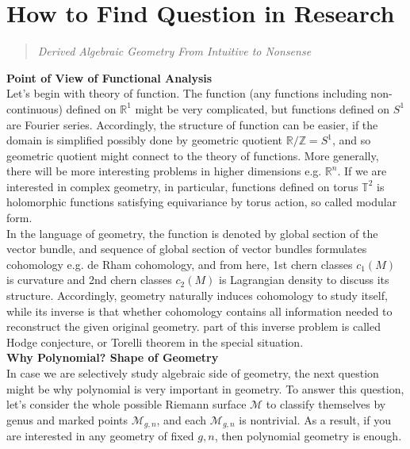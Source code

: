 \documentclass{article}
\begin{document}
\section{How to Find Question in Research}
\begin{quote}
\textit{Derived Algebraic Geometry From Intuitive to Nonsense}
\end{quote}

\noindent
\textbf{Point of View of Functional Analysis} \\

Let's begin with theory of function. The function (any functions including non-continuous) defined on $\mathbb{R}^1$ might be very complicated,
but functions defined on $S^1$ are Fourier series. Accordingly, the structure of function can be easier,
if the domain is simplified possibly done by geometric quotient $\mathbb{R}/\mathbb{Z} = S^1$,
and so geometric quotient might connect to the theory of functions.
More generally, there will be more interesting problems in higher dimensions e.g. $\mathbb{R}^n$.
If we are interested in complex geometry, in particular, functions defined on torus $\mathbb{T}^2$ is 
holomorphic functions satisfying equivariance by torus action, so called modular form. \\

In the language of geometry, the function is denoted by global section of the vector bundle,
and sequence of global section of vector bundles formulates cohomology e.g. de Rham cohomology, and from here, 
1st chern classes $c_1(M)$ is curvature and 2nd chern classes $c_2(M)$ is Lagrangian density to discuss its structure.
Accordingly, geometry naturally induces cohomology to study itself,
while its inverse is that whether cohomology contains all information needed to reconstruct the given original geometry. 
part of this inverse problem is called Hodge conjecture, or Torelli theorem in the special situation. \\


\noindent
\textbf{Why Polynomial? Shape of Geometry} \\

In case we are selectively study algebraic side of geometry, the next question might be why polynomial is very important in geometry.
To answer this question, let's consider the whole possible Riemann surface $\mathcal{M}$ 
to classify themselves by genus and marked points $\mathcal{M}_{g,n}$, and each $\mathcal{M}_{g,n}$ is nontrivial.
As a result, if you are interested in any geometry of fixed $g,n$, then polynomial geometry is enough. \\
\end{document}
